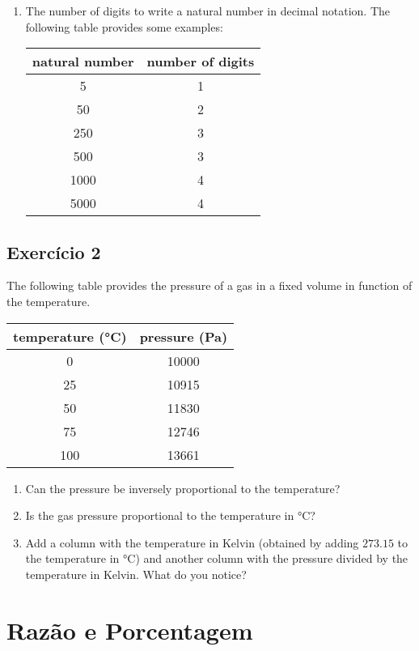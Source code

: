 \begin{enumerate}
\item The number of digits to write a natural number in decimal notation.
  The following table provides some examples:

\begin{tabular}{c | c}
natural number & number of digits \\
\hline
5 & 1 \\
\hline
50 & 2 \\
\hline
250 & 3 \\
\hline
500 & 3 \\
\hline
1000 & 4 \\
\hline
5000 & 4 \\
\hline
\end{tabular}

\end{enumerate}

\subsection*{Exercício 2}

The following table provides the pressure of a gas in a fixed volume in function
of the temperature.

\begin{tabular}{c | c}
temperature (°C) & pressure (Pa) \\
\hline
0 & 10000 \\
\hline
25 & 10915 \\
\hline
50 & 11830 \\
\hline
75 & 12746 \\
\hline
100 & 13661 \\
\hline
\end{tabular}

\begin{enumerate}
\item Can the pressure be inversely proportional to the temperature?
\item Is the gas pressure proportional to the temperature in °C?
\item Add a column with the temperature in Kelvin (obtained by adding $273.15$
  to the temperature in °C) and another column with the pressure divided
  by the temperature in Kelvin. What do you notice?
\end{enumerate}

\section{Razão e Porcentagem}

